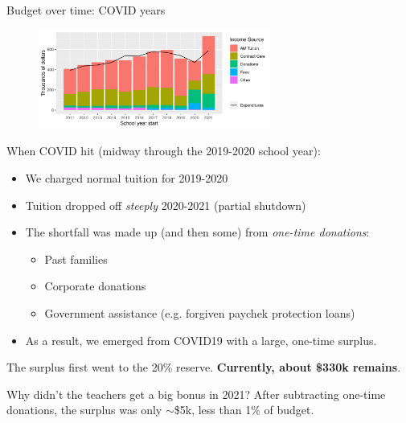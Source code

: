 \documentclass[8pt]{beamer}
\begin{document}
\begin{frame}{Budget over time: COVID years}
\begin{figure}
\begin{center}
\includegraphics[width=3in]{budget_history_w_income_source.png}
\end{center}
\end{figure}

When COVID hit (midway through the 2019-2020 school year):
%
\begin{itemize}
%
\item We charged normal tuition for 2019-2020
\item Tuition dropped off {\em steeply} 2020-2021 (partial shutdown)
\item The shortfall was made up (and then some) from {\em one-time donations}:
\begin{itemize}
    \item Past families
    \item Corporate donations
    \item Government assistance (e.g. forgiven paychek protection loans)
\end{itemize}
\item As a result, we emerged from COVID19 with a large, one-time surplus.
%
\end{itemize}
%
The surplus first went to the 20\% reserve.
\textbf{Currently, about \$330k remains}.

Why didn't the teachers get a big bonus in 2021?  After subtracting one-time
donations, the surplus was only $\sim$\$5k, less than 1\% of budget.

\end{frame}


\end{document}
